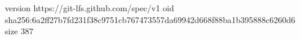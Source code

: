 version https://git-lfs.github.com/spec/v1
oid sha256:6a2ff27b7fd231f38c9751cb767473557da69942d668f88ba1b395888c6260d6
size 387
